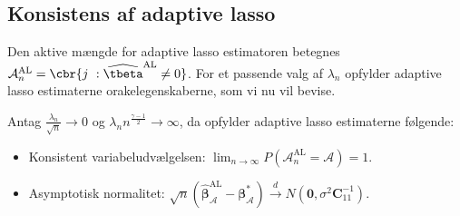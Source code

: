 \subsection{Konsistens af adaptive lasso} \label{subsec:konsistentAL}
Den aktive mængde for adaptive lasso estimatoren betegnes \(\mathcal{A}_n^\text{AL} = \cbr{j \ : \widehat{\tbeta}^{\text{AL}} \neq 0 }\).
For et passende valg af \(\lambda_n\) opfylder adaptive lasso estimaterne orakelegenskaberne, som vi nu vil bevise.
%
\begin{thm}\label{thm:ALoracle}
Antag $\frac{\lambda_n}{\sqrt{n}} \rightarrow 0$ og $\lambda_n n^\frac{\gamma-1}{2} \rightarrow \infty$, da opfylder adaptive lasso estimaterne følgende:
\begin{itemize}
\item Konsistent variabeludvælgelsen: $\lim_{n \rightarrow \infty} P(\mathcal{A}_n^\text{AL}=\mathcal{A})=1$.
\item Asymptotisk normalitet: $\sqrt{n}\left( \widehat{\boldsymbol{\beta}}_\mathcal{A}^{\text{AL}}-\boldsymbol{\beta}_\mathcal{A}^* \right) \overset{d}{\rightarrow} N(\textbf{0},\sigma^2 \boldsymbol{C}_{11}^{-1}).$
\end{itemize} 
\end{thm}
%
